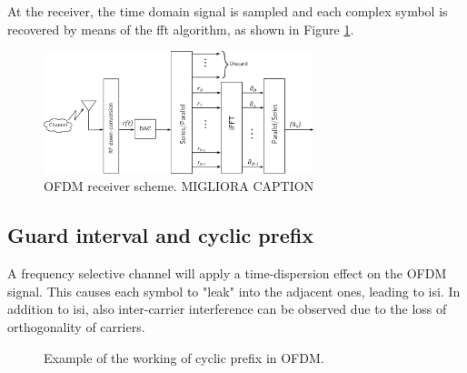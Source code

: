 At the receiver, the time domain signal is sampled and each complex symbol is recovered by means of the \gls{fft} algorithm, as shown in Figure \ref{fig:ofdm_receive}.

\begin{figure}[H]
	\centering
	\includegraphics[width=0.7\textwidth]{Images/theoretical/ofdm/ofdm_receive.png}
	\caption{OFDM receiver scheme. \alert{MIGLIORA CAPTION}}
	\label{fig:ofdm_receive}
\end{figure}

\subsection{Guard interval and cyclic prefix}
A frequency selective channel will apply a time-dispersion effect on the OFDM signal. This causes each symbol to "leak" into the adjacent ones, leading to \gls{isi}.
In addition to \gls{isi}, also inter-carrier interference can be observed due to the loss of orthogonality of carriers.

\begin{figure}[t]
	\centering
	
	\vspace{0.5cm}
	
	\caption[]{Example of the working of cyclic prefix in OFDM.}
	\label{fig:OFDM_cyclic prefix}
\end{figure}

